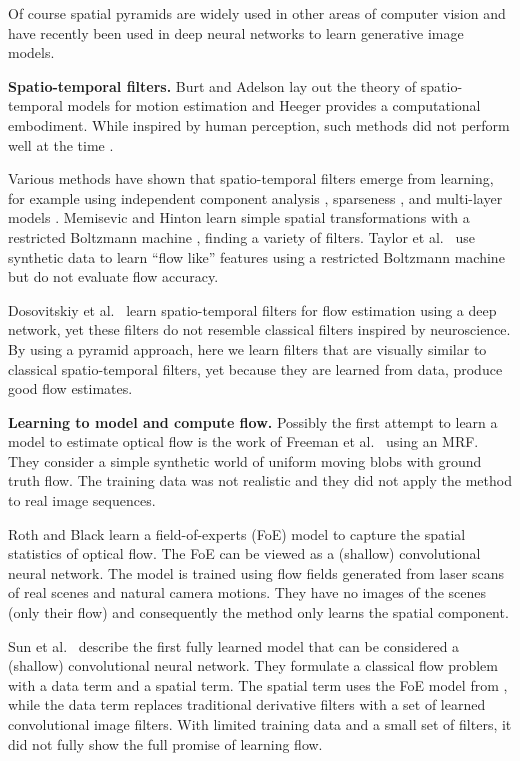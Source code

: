 \documentclass[10pt,twocolumn,letterpaper]{article}
\begin{document}
Of course spatial pyramids are widely used in other areas of computer vision and have recently been used in deep neural networks \cite{denton2015deep} to learn generative image models.


{\bf Spatio-temporal filters.}
Burt and Adelson \cite{adelson1985spatiotemporal} lay out the theory of spatio-temporal models for motion estimation  and 
Heeger \cite{heeger1987model} provides a computational embodiment.
While inspired by human perception, such methods did not perform well at the time \cite{barron94-ijcv}.


Various methods have shown that spatio-temporal filters emerge from learning, for example using independent component analysis \cite{vanHateren:1998}, sparseness \cite{olshausen2003learning}, and multi-layer models \cite{cadieu2008learning}.
Memisevic and Hinton learn simple spatial transformations with a restricted Boltzmann machine \cite{memisevic2010learning}, finding a variety of filters.
Taylor et al.~\cite{taylor2010convolutional} use synthetic data to learn ``flow like'' features using a restricted Boltzmann machine but do not evaluate flow accuracy.

Dosovitskiy et al.~\cite{dosovitskiy2015flownet} learn spatio-temporal filters for flow estimation using a deep network, yet these filters do not resemble classical filters inspired by neuroscience.
By using a pyramid approach, here we learn filters that are visually similar to classical spatio-temporal filters, yet because they are learned from data, produce good flow estimates.






{\bf Learning to model and compute flow.}
Possibly the first attempt to learn a model to estimate optical flow is the work of Freeman et al.~\cite{Freeman2000} using an MRF.
They consider a simple synthetic world of uniform moving blobs with ground truth flow.
The training data was not realistic and they did not apply the method to real image sequences. 

Roth and Black \cite{roth2009fields} learn a field-of-experts (FoE) model to capture the spatial statistics of optical flow.
The FoE can be viewed as a (shallow) convolutional neural network.
The model is trained using flow fields generated from laser scans of real scenes and natural camera motions.
They have no images of the scenes (only their flow) and consequently the method only learns the spatial component.%

Sun et al.~\cite{roth2008learning} describe the first fully learned model that can be considered a (shallow) convolutional neural network.  
They formulate a classical flow problem with a data term and a spatial term.  The spatial term uses the FoE model from \cite{roth2009fields}, while the data term replaces traditional derivative filters with a set of learned convolutional image filters. %
With limited training data and a small set of filters, it did not fully show the full promise of learning flow.%
\end{document}
